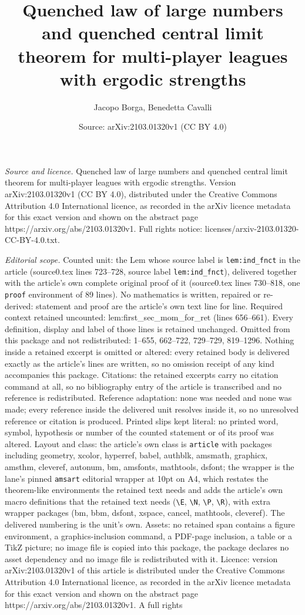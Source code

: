 \documentclass[10pt,a4paper]{amsart}
\title[Quenched law of large numbers and quenched central limit the]{Quenched law of large numbers and quenched central limit theorem for multi-player leagues with ergodic strengths}
\author{Jacopo Borga, Benedetta Cavalli}
\date{Source: arXiv:2103.01320v1 (CC BY 4.0)}
\begin{document}
\maketitle

\noindent\emph{Source and licence.} Quenched law of large numbers and quenched central limit theorem for multi-player leagues with ergodic strengths. Version arXiv:2103.01320v1 (CC BY 4.0), distributed under the Creative Commons Attribution 4.0 International licence, as recorded in the arXiv licence metadata for this exact version and shown on the abstract page https://arxiv.org/abs/2103.01320v1. Full rights notice: licenses/arxiv-2103.01320-CC-BY-4.0.txt.\par\smallskip

\noindent\textit{Editorial scope.} Counted unit: the Lem whose source label is \texttt{lem:ind\_fnct} in the article (source0.tex lines 723--728, source label \texttt{lem:ind\_fnct}), delivered together with the article's own complete original proof of it (source0.tex lines 730--818, one \texttt{proof} environment of 89 lines). No mathematics is written, repaired or re-derived: statement and proof are the article's own text line for line. Required context retained uncounted: lem:first\_sec\_mom\_for\_ret (lines 656--661). Every definition, display and label of those lines is retained unchanged. Omitted from this package and not redistributed: 1--655, 662--722, 729--729, 819--1296. Nothing inside a retained excerpt is omitted or altered: every retained body is delivered exactly as the article's lines are written, so no omission receipt of any kind accompanies this package. Citations: the retained excerpts carry no citation command at all, so no bibliography entry of the article is transcribed and no reference is redistributed. Reference adaptation: none was needed and none was made; every reference inside the delivered unit resolves inside it, so no unresolved reference or citation is produced. Printed slips kept literal: no printed word, symbol, hypothesis or number of the counted statement or of its proof was altered. Layout and class: the article's own class is \texttt{article} with packages including geometry, xcolor, hyperref, babel, authblk, amsmath, graphicx, amsthm, cleveref, autonum, bm, amsfonts, mathtools, dsfont; the wrapper is the lane's pinned \texttt{amsart} editorial wrapper at 10pt on A4, which restates the theorem-like environments the retained text needs and adds the article's own macro definitions that the retained text needs (\texttt{\textbackslash E}, \texttt{\textbackslash N}, \texttt{\textbackslash P}, \texttt{\textbackslash R}), with extra wrapper packages (bm, bbm, dsfont, xspace, cancel, mathtools, cleveref). The delivered numbering is the unit's own. Assets: no retained span contains a figure environment, a graphics-inclusion command, a PDF-page inclusion, a table or a TikZ picture; no image file is copied into this package, the package declares no asset dependency and no image file is redistributed with it. Licence: version arXiv:2103.01320v1 of this article is distributed under the Creative Commons Attribution 4.0 International licence, as recorded in the arXiv licence metadata for this exact version and shown on the abstract page https://arxiv.org/abs/2103.01320v1. A full rights 
\end{document}
